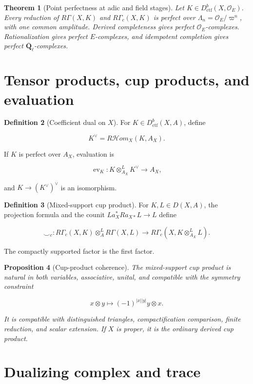 \documentclass[10pt]{article}
\newtheorem{theorem}{Theorem}[section]
\newtheorem{proposition}[theorem]{Proposition}
\theoremstyle{definition}
\newtheorem{definition}[theorem]{Definition}
\newcommand{\Qlb}{\overline{\mathbf Q}_\ell}
\newcommand{\OO}{\mathcal O}
\newcommand{\Dctf}{D^b_{\mathrm{ctf}}}
\newcommand{\RHom}{R\mathcal Hom}
\newcommand{\RG}{R\Gamma}
\newcommand{\RGc}{R\Gamma_c}
\begin{document}
\begin{theorem}[Point perfectness at adic and field stages]
Let \(K\in\Dctf(X,\OO_E)\).  Every reduction of
\(\RG(X,K)\) and \(\RGc(X,K)\) is perfect over
\(\Lambda_n=\OO_E/\varpi^n\), with one common amplitude.  Derived
completeness gives perfect \(\OO_E\)-complexes.  Rationalization gives
perfect \(E\)-complexes, and idempotent completion gives perfect
\(\Qlb\)-complexes.
\end{theorem}

\section{Tensor products, cup products, and evaluation}

\begin{definition}[Coefficient dual on \(X\)]
For \(K\in\Dctf(X,A)\), define

\[
 K^\vee=\RHom_X(K,A_X).
\]

If \(K\) is perfect over \(A_X\), evaluation is

\[
 \operatorname{ev}_K:
 K\otimes^L_{A_X}K^\vee\longrightarrow A_X,
\]

and \(K\to(K^\vee)^\vee\) is an isomorphism.
\end{definition}

\begin{definition}[Mixed-support cup product]
For \(K,L\in D(X,A)\), the projection formula and the counit
\(La_X^*Ra_{X*}L\to L\) define

\[
 \smile_c:
 \RGc(X,K)\otimes_A^L\RG(X,L)
 \longrightarrow
 \RGc(X,K\otimes^L_{A_X}L).
\]

The compactly supported factor is the first factor.
\end{definition}

\begin{proposition}[Cup-product coherence]
The mixed-support cup product is natural in both variables, associative,
unital, and compatible with the symmetry constraint

\[
 x\otimes y\longmapsto(-1)^{|x||y|}y\otimes x.
\]

It is compatible with distinguished triangles, compactification comparison,
finite reduction, and scalar extension.  If \(X\) is proper, it
is the ordinary derived cup product.
\end{proposition}

\section{Dualizing complex and trace}
\end{document}
